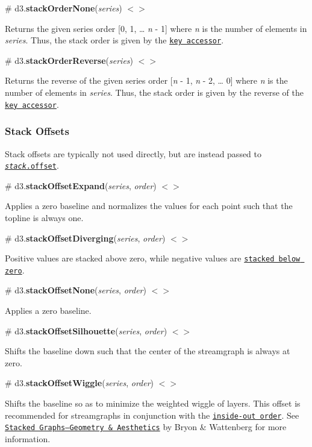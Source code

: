 \label{_stackOrderNone}%
\# d3.{\bfseries stack\+Order\+None}({\itshape series}) \href{https://github.com/d3/d3-shape/blob/master/src/order/none.js}{\tt $<$$>$}

Returns the given series order \mbox{[}0, 1, … {\itshape n} -\/ 1\mbox{]} where {\itshape n} is the number of elements in {\itshape series}. Thus, the stack order is given by the \href{#stack_keys}{\tt key accessor}.

\label{_stackOrderReverse}%
\# d3.{\bfseries stack\+Order\+Reverse}({\itshape series}) \href{https://github.com/d3/d3-shape/blob/master/src/order/reverse.js}{\tt $<$$>$}

Returns the reverse of the given series order \mbox{[}{\itshape n} -\/ 1, {\itshape n} -\/ 2, … 0\mbox{]} where {\itshape n} is the number of elements in {\itshape series}. Thus, the stack order is given by the reverse of the \href{#stack_keys}{\tt key accessor}.

\subsubsection*{Stack Offsets}

Stack offsets are typically not used directly, but are instead passed to \href{#stack_offset}{\tt {\itshape stack}.offset}.

\label{_stackOffsetExpand}%
\# d3.{\bfseries stack\+Offset\+Expand}({\itshape series}, {\itshape order}) \href{https://github.com/d3/d3-shape/blob/master/src/offset/expand.js}{\tt $<$$>$}

Applies a zero baseline and normalizes the values for each point such that the topline is always one.

\label{_stackOffsetDiverging}%
\# d3.{\bfseries stack\+Offset\+Diverging}({\itshape series}, {\itshape order}) \href{https://github.com/d3/d3-shape/blob/master/src/offset/diverging.js}{\tt $<$$>$}

Positive values are stacked above zero, while negative values are \href{https://bl.ocks.org/mbostock/b5935342c6d21928111928401e2c8608}{\tt stacked below zero}.

\label{_stackOffsetNone}%
\# d3.{\bfseries stack\+Offset\+None}({\itshape series}, {\itshape order}) \href{https://github.com/d3/d3-shape/blob/master/src/offset/none.js}{\tt $<$$>$}

Applies a zero baseline.

\label{_stackOffsetSilhouette}%
\# d3.{\bfseries stack\+Offset\+Silhouette}({\itshape series}, {\itshape order}) \href{https://github.com/d3/d3-shape/blob/master/src/offset/silhouette.js}{\tt $<$$>$}

Shifts the baseline down such that the center of the streamgraph is always at zero.

\label{_stackOffsetWiggle}%
\# d3.{\bfseries stack\+Offset\+Wiggle}({\itshape series}, {\itshape order}) \href{https://github.com/d3/d3-shape/blob/master/src/offset/wiggle.js}{\tt $<$$>$}

Shifts the baseline so as to minimize the weighted wiggle of layers. This offset is recommended for streamgraphs in conjunction with the \href{#stackOrderInsideOut}{\tt inside-\/out order}. See \href{http://leebyron.com/streamgraph/}{\tt Stacked Graphs—\+Geometry \& Aesthetics} by Bryon \& Wattenberg for more information. 